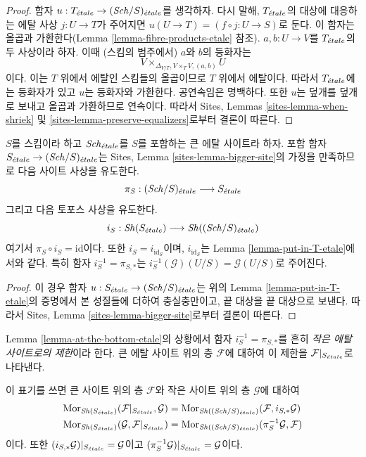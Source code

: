 \begin{proof}
함자 $u : T_{\acute{e}tale} \to (\mathit{Sch}/S)_{\acute{e}tale}$를 생각하자. 다시 말해,
$T_{\acute{e}tale}$의 대상에 대응하는 에탈 사상 $j : U \to T$가 주어지면
$u(U \to T) = (f \circ j : U \to S)$로 둔다. 이 함자는 올곱과
가환한다(Lemma \ref{lemma-fibre-products-etale} 참조).
$a, b : U \to V$를 $T_{\acute{e}tale}$의 두 사상이라 하자. 이때 (스킴의
범주에서) $a$와 $b$의 등화자는
$$
V \times_{\Delta_{V/T}, V \times_T V, (a, b)} U
$$
이다. 이는 $T$ 위에서 에탈인 스킴들의 올곱이므로 $T$ 위에서 에탈이다.
따라서 $T_{\acute{e}tale}$에는 등화자가 있고 $u$는 등화자와 가환한다.
공연속임은 명백하다. 또한 $u$는 덮개를 덮개로 보내고 올곱과
가환하므로 연속이다. 따라서 Sites, Lemmas
\ref{sites-lemma-when-shriek} 및
\ref{sites-lemma-preserve-equalizers}로부터 결론이 따른다.
\end{proof}

\begin{lemma}
\label{lemma-at-the-bottom-etale}
$S$를 스킴이라 하고 $\mathit{Sch}_{\acute{e}tale}$를 $S$를 포함하는 큰 에탈 사이트라
하자. 포함 함자 $S_{\acute{e}tale} \to (\mathit{Sch}/S)_{\acute{e}tale}$는 Sites, Lemma
\ref{sites-lemma-bigger-site}의 가정을 만족하므로 다음 사이트 사상을
유도한다.
$$
\pi_S : (\mathit{Sch}/S)_{\acute{e}tale} \longrightarrow S_{\acute{e}tale}
$$
그리고 다음 토포스 사상을 유도한다.
$$
i_S : \mathop{\mathit{Sh}}\nolimits(S_{\acute{e}tale}) \longrightarrow \mathop{\mathit{Sh}}\nolimits((\mathit{Sch}/S)_{\acute{e}tale})
$$
여기서 $\pi_S \circ i_S = \text{id}$이다. 또한
$i_S = i_{\text{id}_S}$이며, $i_{\text{id}_S}$는 Lemma
\ref{lemma-put-in-T-etale}에서와 같다. 특히 함자
$i_S^{-1} = \pi_{S, *}$는
$i_S^{-1}(\mathcal{G})(U/S) = \mathcal{G}(U/S)$로 주어진다.
\end{lemma}

\begin{proof}
이 경우 함자
$u : S_{\acute{e}tale} \to (\mathit{Sch}/S)_{\acute{e}tale}$는 위의 Lemma
\ref{lemma-put-in-T-etale}의 증명에서 본 성질들에 더하여 충실충만이고,
끝 대상을 끝 대상으로 보낸다. 따라서 Sites, Lemma
\ref{sites-lemma-bigger-site}로부터 결론이 따른다.
\end{proof}

\begin{definition}
\label{definition-restriction-small-etale}
Lemma \ref{lemma-at-the-bottom-etale}의 상황에서 함자
$i_S^{-1} = \pi_{S, *}$를 흔히 {\it 작은 에탈 사이트로의 제한}이라
한다. 큰 에탈 사이트 위의 층 $\mathcal{F}$에 대하여 이 제한을
$\mathcal{F}|_{S_{\acute{e}tale}}$로 나타낸다.
\end{definition}

\noindent
이 표기를 쓰면 큰 사이트 위의 층 $\mathcal{F}$와 작은 사이트 위의 층
$\mathcal{G}$에 대하여
\begin{align*}
\mathop{\mathrm{Mor}}\nolimits_{\mathop{\mathit{Sh}}\nolimits(S_{\acute{e}tale})}(
\mathcal{F}|_{S_{\acute{e}tale}},
\mathcal{G})
& =
\mathop{\mathrm{Mor}}\nolimits_{\mathop{\mathit{Sh}}\nolimits((\mathit{Sch}/S)_{\acute{e}tale})}(
\mathcal{F},
i_{S, *}\mathcal{G}) \\
\mathop{\mathrm{Mor}}\nolimits_{\mathop{\mathit{Sh}}\nolimits(S_{\acute{e}tale})}(
\mathcal{G},
\mathcal{F}|_{S_{\acute{e}tale}})
& =
\mathop{\mathrm{Mor}}\nolimits_{\mathop{\mathit{Sh}}\nolimits((\mathit{Sch}/S)_{\acute{e}tale})}(
\pi_S^{-1}\mathcal{G},
\mathcal{F})
\end{align*}
이다. 또한 $(i_{S, *}\mathcal{G})|_{S_{\acute{e}tale}} = \mathcal{G}$이고
$(\pi_S^{-1}\mathcal{G})|_{S_{\acute{e}tale}} = \mathcal{G}$이다.

